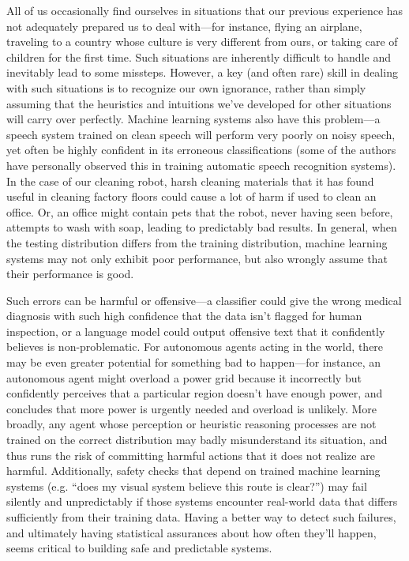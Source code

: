 \documentclass[a4paper,10pt]{article}
\begin{document}
All of us occasionally find ourselves in situations that our previous experience has not adequately prepared us to deal with---for instance, flying an airplane, traveling to a country whose culture is very different from ours, or taking care of children for the first time.  Such situations are inherently difficult to handle and inevitably lead to some missteps.  However, a key (and often rare) skill in dealing with such situations is to recognize our own ignorance, rather than simply assuming that the heuristics and intuitions we’ve developed for other situations will carry over perfectly.  Machine learning systems also have this problem---a speech system trained on clean speech will perform very poorly on noisy speech, yet often be highly confident in its erroneous classifications (some of the authors have personally observed this in training automatic speech recognition systems).  In the case of our cleaning robot, harsh cleaning materials that it has found useful in cleaning factory floors could cause a lot of harm if used to clean an office.  Or, an office might contain pets that the robot, never having seen before, attempts to wash with soap, leading to predictably bad results.  In general, when the testing distribution differs from the training distribution, machine learning systems may not only exhibit poor performance, but also wrongly assume that their performance is good.

Such errors can be harmful or offensive---a classifier could give the wrong medical diagnosis with such high confidence that the data isn’t flagged for human inspection, or a language model could output offensive text that it confidently believes is non-problematic.  For autonomous agents acting in the world, there may be even greater potential for something bad to happen---for instance, an autonomous agent might overload a power grid because it incorrectly but confidently perceives that a particular region doesn’t have enough power, and concludes that more power is urgently needed and overload is unlikely.  More broadly, any agent whose perception or heuristic reasoning processes are not trained on the correct distribution may badly misunderstand its situation, and thus runs the risk of committing harmful actions that it does not realize are harmful.  Additionally, safety checks that depend on trained machine learning systems (e.g. ``does my visual system believe this route is clear?'') may fail silently and unpredictably if those systems encounter real-world data that differs sufficiently from their training data.  Having a better way to detect such failures, and ultimately having statistical assurances about how often they’ll happen, seems critical to building safe and predictable systems.
\end{document}
